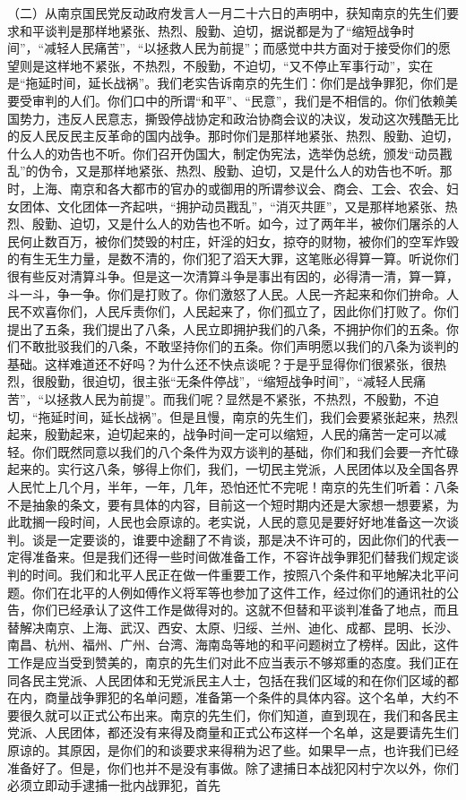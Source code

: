 （二）从南京国民党反动政府发言人一月二十六日的声明中，获知南京的先生们要求和平谈判是那样地紧张、热烈、殷勤、迫切，据说都是为了“缩短战争时间”，“减轻人民痛苦”，“以拯救人民为前提”；而感觉中共方面对于接受你们的愿望则是这样地不紧张，不热烈，不殷勤，不迫切，“又不停止军事行动”，实在是“拖延时间，延长战祸”。我们老实告诉南京的先生们：你们是战争罪犯，你们是要受审判的人们。你们口中的所谓“和平”、“民意”，我们是不相信的。你们依赖美国势力，违反人民意志，撕毁停战协定和政治协商会议的决议，发动这次残酷无比的反人民反民主反革命的国内战争。那时你们是那样地紧张、热烈、殷勤、迫切，什么人的劝告也不听。你们召开伪国大，制定伪宪法，选举伪总统，颁发“动员戡乱”的伪令，又是那样地紧张、热烈、殷勤、迫切，又是什么人的劝告也不听。那时，上海、南京和各大都市的官办的或御用的所谓参议会、商会、工会、农会、妇女团体、文化团体一齐起哄，“拥护动员戡乱”，“消灭共匪”，又是那样地紧张、热烈、殷勤、迫切，又是什么人的劝告也不听。如今，过了两年半，被你们屠杀的人民何止数百万，被你们焚毁的村庄，奸淫的妇女，掠夺的财物，被你们的空军炸毁的有生无生力量，是数不清的，你们犯了滔天大罪，这笔账必得算一算。听说你们很有些反对清算斗争。但是这一次清算斗争是事出有因的，必得清一清，算一算，斗一斗，争一争。你们是打败了。你们激怒了人民。人民一齐起来和你们拚命。人民不欢喜你们，人民斥责你们，人民起来了，你们孤立了，因此你们打败了。你们提出了五条，我们提出了八条，人民立即拥护我们的八条，不拥护你们的五条。你们不敢批驳我们的八条，不敢坚持你们的五条。你们声明愿以我们的八条为谈判的基础。这样难道还不好吗？为什么还不快点谈呢？于是乎显得你们很紧张，很热烈，很殷勤，很迫切，很主张“无条件停战”，“缩短战争时间”，“减轻人民痛苦”，“以拯救人民为前提”。而我们呢？显然是不紧张，不热烈，不殷勤，不迫切，“拖延时间，延长战祸”。但是且慢，南京的先生们，我们会要紧张起来，热烈起来，殷勤起来，迫切起来的，战争时间一定可以缩短，人民的痛苦一定可以减轻。你们既然同意以我们的八个条件为双方谈判的基础，你们和我们会要一齐忙碌起来的。实行这八条，够得上你们，我们，一切民主党派，人民团体以及全国各界人民忙上几个月，半年，一年，几年，恐怕还忙不完呢！南京的先生们听着：八条不是抽象的条文，要有具体的内容，目前这一个短时期内还是大家想一想要紧，为此耽搁一段时间，人民也会原谅的。老实说，人民的意见是要好好地准备这一次谈判。谈是一定要谈的，谁要中途翻了不肯谈，那是决不许可的，因此你们的代表一定得准备来。但是我们还得一些时间做准备工作，不容许战争罪犯们替我们规定谈判的时间。我们和北平人民正在做一件重要工作，按照八个条件和平地解决北平问题。你们在北平的人例如傅作义将军等也参加了这件工作，经过你们的通讯社的公告，你们已经承认了这件工作是做得对的。这就不但替和平谈判准备了地点，而且替解决南京、上海、武汉、西安、太原、归绥、兰州、迪化、成都、昆明、长沙、南昌、杭州、福州、广州、台湾、海南岛等地的和平问题树立了榜样。因此，这件工作是应当受到赞美的，南京的先生们对此不应当表示不够郑重的态度。我们正在同各民主党派、人民团体和无党派民主人士，包括在我们区域的和在你们区域的都在内，商量战争罪犯的名单问题，准备第一个条件的具体内容。这个名单，大约不要很久就可以正式公布出来。南京的先生们，你们知道，直到现在，我们和各民主党派、人民团体，都还没有来得及商量和正式公布这样一个名单，这是要请先生们原谅的。其原因，是你们的和谈要求来得稍为迟了些。如果早一点，也许我们已经准备好了。但是，你们也并不是没有事做。除了逮捕日本战犯冈村宁次以外，你们必须立即动手逮捕一批内战罪犯，首先